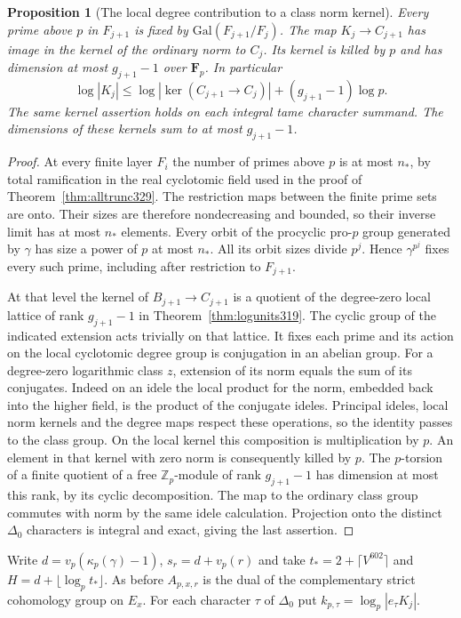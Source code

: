 \documentclass[a4paper,11pt]{article}
\newtheorem{proposition}{Proposition}[section]
\theoremstyle{definition}
\theoremstyle{remark}
\newcommand{\ZZ}{\mathbb Z}\newcommand{\ord}{\operatorname{ord}}
\numberwithin{equation}{section}
\begin{document}
\begin{proposition}[The local degree contribution to a class norm kernel]\leavevmode\label{prop:localnorm341}
Every prime above $p$ in $F_{j+1}$ is fixed by
$\mathrm{Gal}(F_{j+1}/F_j)$. The map $K_j\to C_{j+1}$ has image
in the kernel of the ordinary norm to $C_j$. Its kernel is killed
by $p$ and has dimension at most $g_{j+1}-1$ over $\mathbf F_p$.
In particular
\[
 \log|K_j|\le\log|\ker(C_{j+1}\to C_j)|+(g_{j+1}-1)\log p .
\]
The same kernel assertion holds on each integral tame character
summand. The dimensions of these kernels sum to at most $g_{j+1}-1$.
\end{proposition}
\begin{proof}
At every finite layer $F_i$ the number of primes above $p$ is at
most $n_*$, by total ramification in the real cyclotomic field used
in the proof of Theorem~\ref{thm:alltrunc329}. The restriction maps
between the finite prime sets are onto. Their sizes are therefore
nondecreasing and bounded, so their inverse limit has at most $n_*$
elements. Every orbit of the procyclic pro-$p$ group generated by
$\gamma$ has size a power of $p$ at most $n_*$. All its orbit sizes
divide $p^j$. Hence $\gamma^{p^j}$ fixes every such prime, including
after restriction to $F_{j+1}$.

At that level the kernel of $B_{j+1}\to C_{j+1}$ is a quotient
of the degree-zero local lattice of rank $g_{j+1}-1$ in
Theorem~\ref{thm:logunits319}. The cyclic group of the indicated
extension acts trivially on that lattice. It fixes each prime and
its action on the local cyclotomic degree group is conjugation in
an abelian group. For a degree-zero logarithmic class $z$, extension
of its norm equals the sum of its conjugates. Indeed on an idele
the local product for the norm, embedded back into the higher
field, is the product of the conjugate ideles. Principal ideles,
local norm kernels and the degree maps respect these operations,
so the identity passes to the class group. On the local kernel this
composition is multiplication by $p$. An element in that kernel
with zero norm is consequently killed by $p$. The $p$-torsion of
a finite quotient of a free $\ZZ_p$-module of rank $g_{j+1}-1$ has
dimension at most this rank, by its cyclic decomposition. The map
to the ordinary class group commutes with norm by the same idele
calculation. Projection onto the distinct $\Delta_0$ characters is
integral and exact, giving the last assertion.
\end{proof}

Write $d=v_p(\kappa_p(\gamma)-1)$, $s_r=d+v_p(r)$ and take
$t_*=2+\lceil V^{602}\rceil$ and $H=d+\lfloor\log_p t_*\rfloor$.
As before $A_{p,x,r}$ is the dual of the complementary strict
cohomology group on $E_x$. For each character $\tau$ of $\Delta_0$
put $k_{p,\tau}=\log_p|e_\tau K_j|$.
\end{document}
